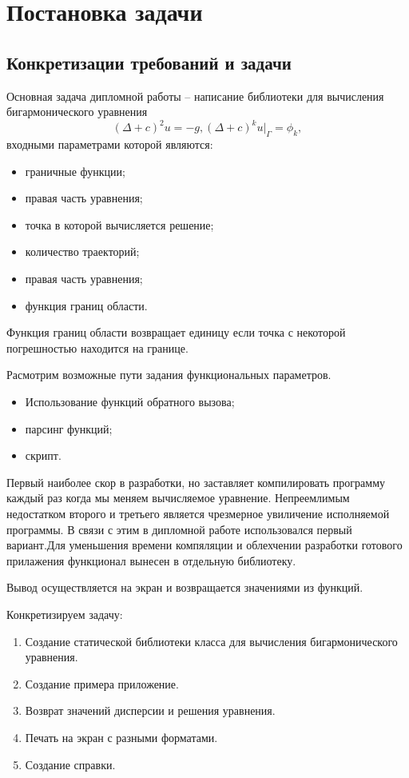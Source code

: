 \chapter{Постановка задачи}
\section{Конкретизации требований и задачи}
Основная задача дипломной работы -- написание библиотеки для вычисления бигармонического уравнения $$ (\Delta +c)^{2}u=-g, (\Delta+c)^{k}u|_{\Gamma}=\phi_{k}, $$входными параметрами которой являются:
\begin{itemize}
	\item граничные функции;
	\item правая часть уравнения;
	\item точка в которой вычисляется решение;
	\item количество траекторий;
	\item правая часть уравнения;
	\item функция границ области.
\end{itemize}
Функция границ области возвращает единицу если точка с некоторой погрешностью находится на границе. 

Расмотрим возможные пути задания функциональных параметров.
\begin{itemize}
	\item Использование функций обратного вызова;
	\item парсинг функций;
	\item скрипт.
\end{itemize}
Первый наиболее скор в разработки, но заставляет компилировать программу каждый раз когда мы меняем вычисляемое уравнение. Непреемлимым недостатком второго и третьего является чрезмерное увиличение исполняемой программы. В связи с этим в дипломной работе использовался первый вариант.Для уменьшения времени компяляции и облехчении разработки готового прилажения функционал вынесен в отдельную библиотеку. 

Вывод осуществляется на экран и возвращается значениями из функций. 

Конкретизируем задачу: 
\begin{enumerate}
	\item Создание статической библиотеки класса для вычисления бигармонического уравнения.
	\item Создание примера приложение.
	\item Возврат значений дисперсии и решения уравнения.
	\item Печать на экран с разными форматами.
	\item Создание справки.
\end{enumerate}
